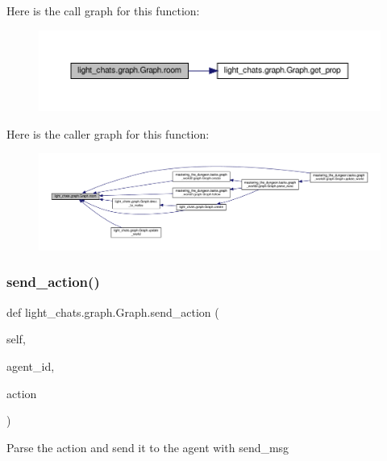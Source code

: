 Here is the call graph for this function\+:
\nopagebreak
\begin{figure}[H]
\begin{center}
\leavevmode
\includegraphics[width=350pt]{classlight__chats_1_1graph_1_1Graph_a90e0b9f3f4a4acc29c49cc730aad1539_cgraph}
\end{center}
\end{figure}
Here is the caller graph for this function\+:
\nopagebreak
\begin{figure}[H]
\begin{center}
\leavevmode
\includegraphics[width=350pt]{classlight__chats_1_1graph_1_1Graph_a90e0b9f3f4a4acc29c49cc730aad1539_icgraph}
\end{center}
\end{figure}
\mbox{\label{classlight__chats_1_1graph_1_1Graph_a783ebf83adeed30c0ba89679f535d33c}} 
\subsubsection{\texorpdfstring{send\+\_\+action()}{send\_action()}}
{\footnotesize\ttfamily def light\+\_\+chats.\+graph.\+Graph.\+send\+\_\+action (\begin{DoxyParamCaption}\item[{}]{self,  }\item[{}]{agent\+\_\+id,  }\item[{}]{action }\end{DoxyParamCaption})}

\begin{DoxyVerb}Parse the action and send it to the agent with send_msg\end{DoxyVerb}
 


